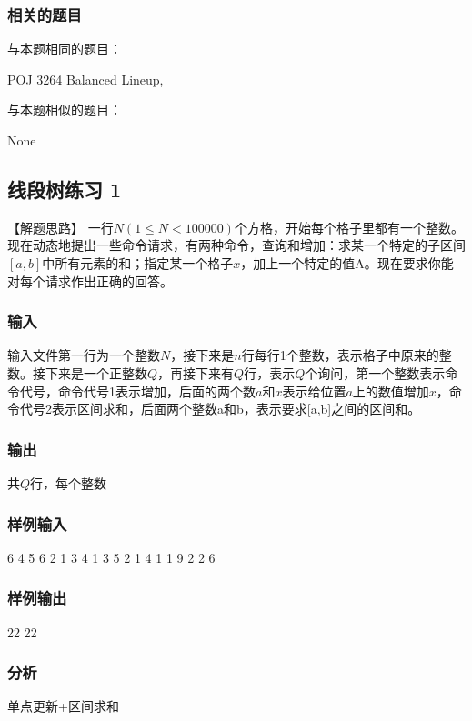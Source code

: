 \subsubsection{相关的题目}
与本题相同的题目：
\begindot
\item POJ 3264 Balanced Lineup, 
\myenddot

与本题相似的题目：
\begindot
\item  None
\myenddot


\subsection{线段树练习 1} %
【解题思路】
一行$N(1\leq N < 100000)$个方格，开始每个格子里都有一个整数。现在动态地提出一些命令请求，有两种命令，查询和增加：求某一个特定的子区间$[a,b]$中所有元素的和；指定某一个格子$x$，加上一个特定的值A。现在要求你能对每个请求作出正确的回答。

\subsubsection{输入}
输入文件第一行为一个整数$N$，接下来是$n$行每行1个整数，表示格子中原来的整数。接下来是一个正整数$Q$，再接下来有$Q$行，表示$Q$个询问，第一个整数表示命令代号，命令代号1表示增加，后面的两个数$a$和$x$表示给位置$a$上的数值增加$x$，命令代号2表示区间求和，后面两个整数a和b，表示要求[a,b]之间的区间和。

\subsubsection{输出}
共$Q$行，每个整数

\subsubsection{样例输入}
\begin{Code}
6
4 
5 
6 
2 
1 
3
4
1 3 5
2 1 4
1 1 9
2 2 6
\end{Code}

\subsubsection{样例输出}
\begin{Code}
22
22
\end{Code}

\subsubsection{分析}
单点更新+区间求和

